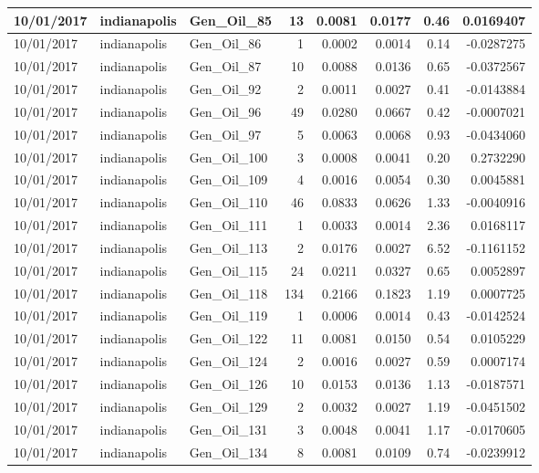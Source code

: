 \documentclass[
  letterpaper,
  DIV=11,
  numbers=noendperiod]{scrartcl}
\begin{document}
\begin{tabular}{l|l|l|r|r|r|r|r}
\hline
10/01/2017 & indianapolis & Gen\_Oil\_85 & 13 & 0.0081 & 0.0177 & 0.46 & 0.0169407\\
\hline
10/01/2017 & indianapolis & Gen\_Oil\_86 & 1 & 0.0002 & 0.0014 & 0.14 & -0.0287275\\
\hline
10/01/2017 & indianapolis & Gen\_Oil\_87 & 10 & 0.0088 & 0.0136 & 0.65 & -0.0372567\\
\hline
10/01/2017 & indianapolis & Gen\_Oil\_92 & 2 & 0.0011 & 0.0027 & 0.41 & -0.0143884\\
\hline
10/01/2017 & indianapolis & Gen\_Oil\_96 & 49 & 0.0280 & 0.0667 & 0.42 & -0.0007021\\
\hline
10/01/2017 & indianapolis & Gen\_Oil\_97 & 5 & 0.0063 & 0.0068 & 0.93 & -0.0434060\\
\hline
10/01/2017 & indianapolis & Gen\_Oil\_100 & 3 & 0.0008 & 0.0041 & 0.20 & 0.2732290\\
\hline
10/01/2017 & indianapolis & Gen\_Oil\_109 & 4 & 0.0016 & 0.0054 & 0.30 & 0.0045881\\
\hline
10/01/2017 & indianapolis & Gen\_Oil\_110 & 46 & 0.0833 & 0.0626 & 1.33 & -0.0040916\\
\hline
10/01/2017 & indianapolis & Gen\_Oil\_111 & 1 & 0.0033 & 0.0014 & 2.36 & 0.0168117\\
\hline
10/01/2017 & indianapolis & Gen\_Oil\_113 & 2 & 0.0176 & 0.0027 & 6.52 & -0.1161152\\
\hline
10/01/2017 & indianapolis & Gen\_Oil\_115 & 24 & 0.0211 & 0.0327 & 0.65 & 0.0052897\\
\hline
10/01/2017 & indianapolis & Gen\_Oil\_118 & 134 & 0.2166 & 0.1823 & 1.19 & 0.0007725\\
\hline
10/01/2017 & indianapolis & Gen\_Oil\_119 & 1 & 0.0006 & 0.0014 & 0.43 & -0.0142524\\
\hline
10/01/2017 & indianapolis & Gen\_Oil\_122 & 11 & 0.0081 & 0.0150 & 0.54 & 0.0105229\\
\hline
10/01/2017 & indianapolis & Gen\_Oil\_124 & 2 & 0.0016 & 0.0027 & 0.59 & 0.0007174\\
\hline
10/01/2017 & indianapolis & Gen\_Oil\_126 & 10 & 0.0153 & 0.0136 & 1.13 & -0.0187571\\
\hline
10/01/2017 & indianapolis & Gen\_Oil\_129 & 2 & 0.0032 & 0.0027 & 1.19 & -0.0451502\\
\hline
10/01/2017 & indianapolis & Gen\_Oil\_131 & 3 & 0.0048 & 0.0041 & 1.17 & -0.0170605\\
\hline
10/01/2017 & indianapolis & Gen\_Oil\_134 & 8 & 0.0081 & 0.0109 & 0.74 & -0.0239912\\

\end{tabular}
\end{document}

